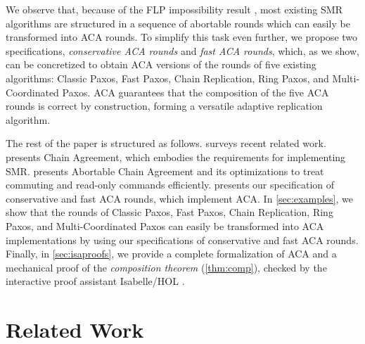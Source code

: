 We observe that, because of the FLP impossibility result
\cite{FischerLynchPaterson83ImpossibilityDistributedConsensusOneFaultyProcess},
most existing SMR algorithms are structured in a sequence of abortable
rounds which can easily be transformed into ACA rounds. To simplify
this task even further, we propose two specifications, \emph{conservative
ACA rounds} and \emph{fast ACA rounds}, which, as we show, can be concretized
to obtain ACA versions of the rounds of five existing algorithms: 
Classic Paxos, Fast Paxos, Chain Replication, Ring Paxos,
and Multi-Coordinated Paxos. ACA guarantees that the composition of the five ACA
rounds is correct by construction, forming a versatile adaptive replication
algorithm. 

The rest of the paper is structured as follows.
 surveys recent related work.  presents Chain
Agreement, which embodies the requirements for implementing SMR. 
presents Abortable Chain Agreement and its optimizations to treat commuting
and read-only commands efficiently.  presents our specification
of conservative and fast ACA rounds, which implement ACA. In
\cref{sec:examples}, we show that the rounds of  
Classic Paxos, Fast Paxos, Chain Replication, Ring Paxos,
and Multi-Coordinated Paxos can easily be transformed into ACA implementations
by using our specifications of conservative and fast ACA rounds.
Finally, in \cref{sec:isaproofs}, we provide a complete formalization of ACA
and a mechanical proof of the \emph{composition theorem} (\cref{thm:comp}),
checked by the interactive proof assistant Isabelle/HOL \cite{NipkowPaulsonWenzel02IsabelleHOL}. 

\begin{comment}
Abortable Chain Agreement builds on several recent advances in SMR
algorithms: ACA allows acceptors to only eventually reach agreement,
like in Generalized Paxos \cite{Lamport05GeneralizeConsensus},
boosting performance when most commands commute; ACA allows fast
execution of read commands like in Generalized Lattice Agreement
\cite{FalerioETAL12GeneralizedLatticeAgreement}; ACA implementations
can tolerate $f$ faults with only $f+1$ replicas and replace crashed replicas
upon changing round, as in Vertical Paxos  \cite{LamportMalkhiZhou09VerticalPaxosPrimarybackupReplication}.  
\end{comment}

\section{Related Work}
\label{sec:related}

